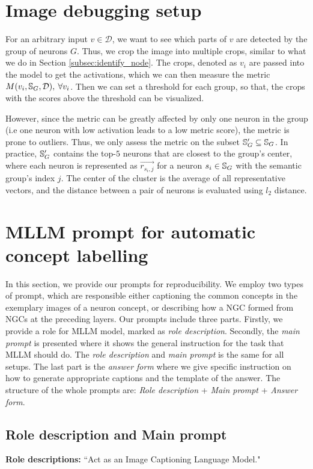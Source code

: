 \section{Image debugging setup}
\label{debugging_setup}
For an arbitrary input $v \in \mathcal{D}$, we want to see which parts of $v$ are detected by the group of neurons $G$. Thus, we crop the image into multiple crops, similar to what we do in Section \ref{subsec:identify_node}. The crops, denoted as $v_i$ are passed into the model to get the activations, which we can then measure the metric $M(v_i, {\mathbb{S}}_G, \mathcal{D}), \: \forall v_i$. Then we can set a threshold for each group, so that, the crops with the scores above the threshold can be visualized. 

However, since the metric can be greatly affected by only one neuron in the group (i.e one neuron with low activation leads to a low metric score), the metric is prone to outliers. Thus, we only assess the metric on the subset ${\mathbb{S}}_G' \subseteq {\mathbb{S}}_G$. In practice, ${\mathbb{S}}_G'$ contains the top-$5$ neurons that are closest to the group's center, where each neuron is represented as $\overrightarrow{r_{s_i,j}}$ for a neuron $s_i \in {\mathbb{S}}_G$ with the semantic group's index $j$. The center of the cluster is the average of all representative vectors, and the distance between a pair of neurons is evaluated using $l_2$ distance.


\section{MLLM prompt for automatic concept labelling}
\label{prompt}
In this section, we provide our prompts for reproducibility. We employ two types of prompt, which are responsible either captioning the common concepts in the exemplary images of a neuron concept, or describing how a NGC formed from NGCs at the preceding layers. Our prompts include three parts. Firstly, we provide a role for MLLM model, marked as \textit{role description}. Secondly, the \textit{main prompt} is presented where it shows the general instruction for the task that MLLM should do. The \textit{role description }and \textit{main prompt} is the same for all setups. The last part is the \textit{answer form} where we give specific instruction on how to generate appropriate captions and the template of the answer. The structure of the whole prompts are: \textit{Role description} + \textit{Main prompt} + \textit{Answer form}.

\subsection{Role description and Main prompt}
\textbf{Role descriptions:} 
``Act as an Image Captioning Language Model."

